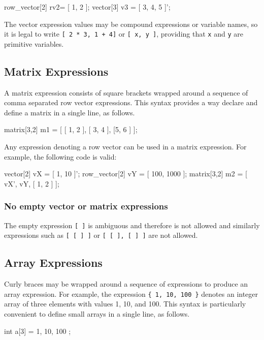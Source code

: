 %
\begin{stancode}
row_vector[2] rv2=  [ 1, 2 ];
vector[3] v3 = [ 3, 4, 5 ]';
\end{stancode}
%

The vector expression values may be compound expressions
or variable names,  so it is legal to write
\Verb|[ 2 * 3, 1 + 4]|  or \Verb|[ x, y ]|, providing that \Verb|x|
and \Verb|y| are primitive variables.

\subsection{Matrix Expressions}

A matrix expression consists of square brackets wrapped
around a sequence of comma separated row vector expressions.
This syntax provides a way declare and define a matrix in a single
line, as follows.

%
\begin{stancode}
matrix[3,2] m1 = [ [ 1, 2 ], [ 3, 4 ], [5, 6 ] ];
\end{stancode}
%

Any expression denoting a row vector can be used in a matrix expression.
For example, the following code is valid:

%
\begin{stancode}
vector[2] vX = [ 1, 10 ]';
row_vector[2] vY = [ 100, 1000 ];
matrix[3,2] m2 = [ vX', vY, [ 1, 2 ]  ];
\end{stancode}
%

\subsubsection{No empty vector or matrix expressions}

The empty expression \Verb|[ ]| is ambiguous and therefore is not
allowed and similarly expressions such as \Verb|[ [ ] ]| or
\Verb|[ [ ], [ ] ]| are not allowed.

\subsection{Array Expressions}

Curly braces may be wrapped around a sequence of expressions to
produce an array expression.  For example, the expression
\Verb|{ 1, 10, 100 }| denotes an integer array of three elements with
values 1, 10, and 100.  This syntax is particularly convenient to
define small arrays in a single line, as follows.
%
\begin{stancode}
int a[3] = { 1, 10, 100 };
\end{stancode}
%

